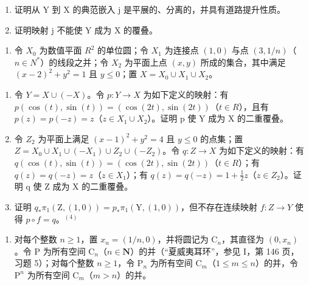 \begin{enumerate}
\def\labelenumi{\alph{enumi})}
\item
  证明从 Y 到 X 的典范嵌入 j 是平展的、分离的，并具有道路提升性质。
\item
  证明映射 j 不能使 Y 成为 X 的覆叠。
\end{enumerate}

\begin{enumerate}
\def\labelenumi{\arabic{enumi})}
\setcounter{enumi}{4}
\tightlist
\item
  令 \(X_{0}\) 为数值平面 \(R^{2}\) 的单位圆；令 \(X_{1}\) 为连接点 \((1,0)\) 与点 \((3,1/n)\)（\(n \in N^{*}\)）的线段之并；令 \(X_{2}\) 为平面上点 \((x,y)\) 所成的集合，其中满足 \((x-2)^{2} + y^{2} = 1\) 且 \(y \leqslant 0\)；置 \(X = X_{0} \cup X_{1} \cup X_{2}\)。
\end{enumerate}

\begin{enumerate}
\def\labelenumi{\alph{enumi})}
\item
  令 \(Y = X \cup (-X)\)。令 \(p: Y \to X\) 为如下定义的映射：有 \(p(\cos(t), \sin(t)) = (\cos(2t), \sin(2t))\)（\(t \in R\)），且有 \(p(z) = p(-z) = z\)（\(z \in X_{1} \cup X_{2}\)）。证明 p 使 Y 成为 X 的二重覆叠。
\item
  令 \(Z_{2}\) 为平面上满足 \((x-1)^{2}+y^{2}=4\) 且 \(y\leqslant0\) 的点集；置 \(Z=X_{0}\cup X_{1}\cup(-X_{1})\cup Z_{2}\cup(-Z_{2})\)。令 \(q:Z\to X\) 为如下定义的映射：有 \(q(\cos(t),\sin(t))=(\cos(2t),\sin(2t))\)（\(t\in R\)）；有 \(q(z)=q(-z)=z\)（\(z\in X_{1}\)）；有 \(q(z)=q(-z)=1+\frac{1}{2}z\)（\(z\in Z_{2}\)）。证明 q 使 Z 成为 X 的二重覆叠。
\item
  证明 \(q_{*}\pi_{1}(\mathrm{Z},(1,0)) = p_{*}\pi_{1}(\mathrm{Y},(1,0))\)，但不存在连续映射 \(f\colon Z \to Y\) 使得 \(p \circ f = q\)。\(^{(4)}\)
\end{enumerate}

\begin{enumerate}
\def\labelenumi{\arabic{enumi})}
\setcounter{enumi}{5}
\tightlist
\item
  对每个整数 \(n \geqslant 1\)，置 \(x_{n} = (1/n,0)\)，并将圆记为 \(\mathrm{C}_{n}\)，其直径为 \((0,x_{n})\)。令 P 为所有空间 \(\mathrm{C}_{n}\)（\(n \in \mathbf{N}\)）的并（“夏威夷耳环”，参见 I，第 146 页，习题 5）；对每个整数 \(n \geqslant 1\)，令 \(\mathrm{P}_{n}\) 为所有空间 \(\mathrm{C}_{m}\)（\(1 \leqslant m \leqslant n\)）的并，令 \(\mathrm{P}^{n}\) 为所有空间 \(\mathrm{C}_{m}\)（\(m > n\)）的并。
\end{enumerate}

